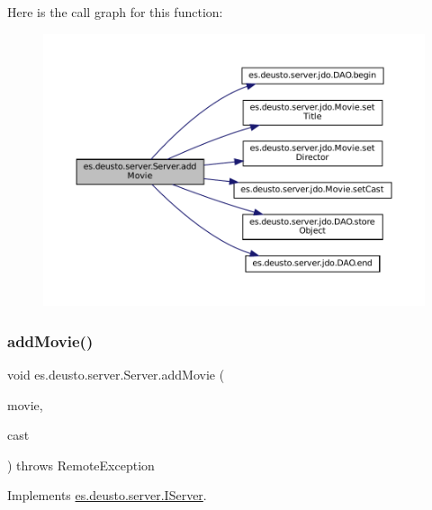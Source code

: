 Here is the call graph for this function\+:\nopagebreak
\begin{figure}[H]
\begin{center}
\leavevmode
\includegraphics[width=350pt]{classes_1_1deusto_1_1server_1_1_server_a150317903dc393d29f39db81e79131e0_cgraph}
\end{center}
\end{figure}
\mbox{\label{classes_1_1deusto_1_1server_1_1_server_ac5b894308dff2d0d47b7c665f190603c}} 
\subsubsection{\texorpdfstring{addMovie()}{addMovie()}\hspace{0.1cm}{\footnotesize\ttfamily [2/2]}}
{\footnotesize\ttfamily void es.\+deusto.\+server.\+Server.\+add\+Movie (\begin{DoxyParamCaption}\item[{\mbox{\hyperlink{classes_1_1deusto_1_1server_1_1data_1_1_movie_d_t_o}{Movie\+D\+TO}}}]{movie,  }\item[{String \mbox{[}$\,$\mbox{]}}]{cast }\end{DoxyParamCaption}) throws Remote\+Exception}



Implements \mbox{\hyperlink{interfacees_1_1deusto_1_1server_1_1_i_server_a9567844dce410325c606945c8d7c4dac}{es.\+deusto.\+server.\+I\+Server}}.



